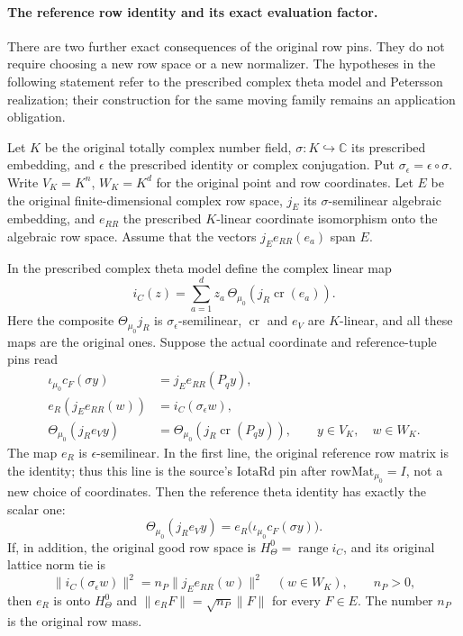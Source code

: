 \paragraph{The reference row identity and its exact evaluation factor.}
There are two further exact consequences of the original row pins.
They do not require choosing a new row space or a new normalizer.
The hypotheses in the following statement refer to the prescribed
complex theta model and Petersson realization; their construction
for the same moving family remains an application obligation.

\begin{lemma}
\label{lem:retained-reference-row-pins}
Let \(K\) be the original totally complex number field,
\(\sigma:K\hookrightarrow\mathbb C\) its prescribed embedding,
and \(\epsilon\) the prescribed identity or complex conjugation.
Put \(\sigma_\epsilon=\epsilon\circ\sigma\).
Write \(V_K=K^n\), \(W_K=K^d\) for the original point and
row coordinates.  Let \(E\) be the original finite-dimensional
complex row space, \(j_E\) its \(\sigma\)-semilinear algebraic
embedding, and \(e_{RR}\) the prescribed \(K\)-linear
coordinate isomorphism onto the algebraic row space.  Assume that
the vectors \(j_Ee_{RR}(e_a)\) span \(E\).

In the prescribed complex theta model define the complex linear map
\[
 i_C(z)=\sum_{a=1}^d z_a\,
            \Theta_{\mu_0}(j_R\operatorname{cr}(e_a)).
                                                        \tag{RE1}
\]
Here the composite \(\Theta_{\mu_0}j_R\) is
\(\sigma_\epsilon\)-semilinear, \(\operatorname{cr}\) and
\(e_V\) are \(K\)-linear, and all these maps are the original
ones.  Suppose the
actual coordinate and reference-tuple pins read
\[
\begin{split}
 \iota_{\mu_0}c_F(\sigma y)&=j_Ee_{RR}(P_qy),\\
 e_R(j_Ee_{RR}(w))&=i_C(\sigma_\epsilon w),\\
 \Theta_{\mu_0}(j_Re_Vy)
      &=\Theta_{\mu_0}(j_R\operatorname{cr}(P_qy)),
 \qquad y\in V_K,\quad w\in W_K .
\end{split}                                             \tag{RE2}
\]
The map \(e_R\) is \(\epsilon\)-semilinear.  In the first
line, the original reference row matrix is the identity; thus
this line is the source's \(\mathrm{IotaRd}\) pin after
\(\mathrm{rowMat}_{\mu_0}=I\), not a new choice of coordinates.
Then the reference theta identity has exactly the scalar one:
\[
 \Theta_{\mu_0}(j_Re_Vy)
       =e_R\bigl(\iota_{\mu_0}c_F(\sigma y)\bigr).
                                                        \tag{RE3}
\]
If, in addition, the original good row space is
\(H_\Theta^0=\operatorname{range}i_C\), and its original
lattice norm tie is
\[
 \|i_C(\sigma_\epsilon w)\|^2
       =n_P\|j_Ee_{RR}(w)\|^2\quad(w\in W_K),
       \qquad n_P>0,                                   \tag{RE4}
\]
then \(e_R\) is onto \(H_\Theta^0\) and
\(\|e_RF\|=\sqrt{n_P}\|F\|\) for every \(F\in E\).
The number \(n_P\) is the original row mass.
\end{lemma}

